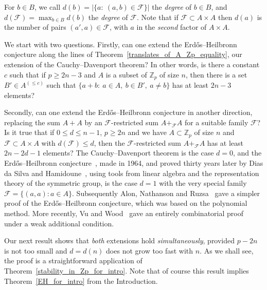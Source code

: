 \documentclass[12pt,reqno]{amsart}
\theoremstyle{definition}
\renewcommand\le{\leqslant}
\renewcommand\ge{\geqslant}
\begin{document}
\vspace{5pt}
For $b\in B$, we call $d(b)=\big|\{a: \ (a,b)\in {\mathcal F}\}\big|$ the {\em degree} of $b\in B$, and $d({\mathcal F})=\max_{b\in B} d(b)$ the {\em degree} of ${\mathcal F}$. Note that if ${\mathcal F} \subset A \times A$ then $d(a)$ is the number of pairs $(a', a)\in {\mathcal F}$, with $a$ in the {\em second} factor of $A\times A$.


\vspace{7pt}
We start with two questions. Firstly, can one extend the Erd\H{o}s--Heilbronn conjecture along the lines of Theorem~\ref{translates_of_A_Zp_equality},
our extension of the Cauchy--Davenport theorem? In other words, is there a constant $c$ such that if $p\ge 2n-3$ and $A$ is a subset of ${\mathbb Z}_p$ of size $n$, then there is a set $B'\in A^{(\le c)}$ such that $\{a+b: \ a\in A,\ b\in B', \ a\ne b\}$ has at least $2n-3$ elements?

\vspace{7pt}
Secondly, can one extend the Erd\H{o}s--Heilbronn conjecture in another direction, replacing the sum $A+A$ by an ${\mathcal F}$-restricted sum $A+_{\mathcal F} A$ for a suitable family ${\mathcal F}$? Is it true that if $0\le d \le n-1$, $p\ge 2n$ and we have $A \subset {\mathbb Z}_p$ of size $n$ and ${\mathcal F} \subset A \times A$ with
$d({\mathcal F}) \le d$, then the
${\mathcal F}$-restricted sum $A+_{\mathcal F} A$ has at least $2n-2d-1$ elements? The Cauchy--Davenport theorem is the case $d=0$, and the Erd\H{o}s--Heilbronn conjecture~\cite{ErdHeil}, made in 1964, and proved thirty years later
by Dias da Silva and Hamidoune~\cite{DiHa}, using tools from linear algebra and the representation
theory of the symmetric group, is the case $d=1$ with the very special family
${\mathcal F} = \{ (a,a): a \in A \}$. Subsequently Alon, Nathanson and Ruzsa~\cite{AlNaRu} gave a simpler
proof of the Erd\H{o}s--Heilbronn conjecture, which was based on the polynomial method. More recently, Vu and Wood~\cite{VuWood-09}  gave an entirely combinatorial proof under a weak additional condition.


\vspace{5pt}
Our next result shows that {\em both} extensions hold {\em simultaneously}, provided $p-2n$ is not too small and $d=d(n)$ does not grow too fast with $n$. As we shall see, the proof is a straightforward application of Theorem~\ref{stability_in_Zp_for_intro}. Note that of course this result implies Theorem~\ref{EH_for_intro} from the Introduction.
\end{document}
